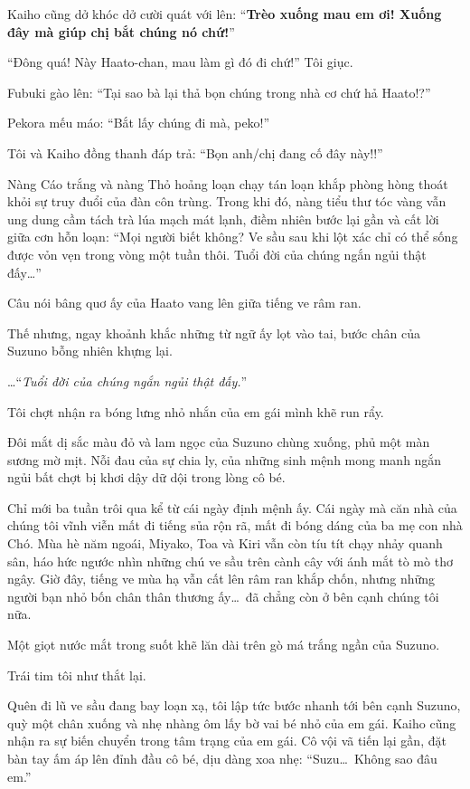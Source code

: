 \documentclass[../main.tex]{subfiles}
\begin{document}
Kaiho cũng dở khóc dở cười quát với lên: ``\textbf{Trèo xuống mau em ơi! Xuống đây mà giúp chị bắt chúng nó chứ!}''

``Đông quá! Này Haato-chan, mau làm gì đó đi chứ!'' Tôi giục.

Fubuki gào lên: ``Tại sao bà lại thả bọn chúng trong nhà cơ chứ hả Haato!?''

Pekora mếu máo: ``Bắt lấy chúng đi mà, peko!''

Tôi và Kaiho đồng thanh đáp trả: ``Bọn anh/chị đang cố đây này!!''

Nàng Cáo trắng và nàng Thỏ hoảng loạn chạy tán loạn khắp phòng hòng thoát khỏi sự truy đuổi của đàn côn trùng. Trong khi đó, nàng tiểu thư tóc vàng vẫn ung dung cầm tách trà lúa mạch mát lạnh, điềm nhiên bước lại gần và cất lời giữa cơn hỗn loạn: ``Mọi người biết không? Ve sầu sau khi lột xác chỉ có thể sống được vỏn vẹn trong vòng một tuần thôi. Tuổi đời của chúng ngắn ngủi thật đấy\dots''


Câu nói bâng quơ ấy của Haato vang lên giữa tiếng ve râm ran.

Thế nhưng, ngay khoảnh khắc những từ ngữ ấy lọt vào tai, bước chân của Suzuno bỗng nhiên khựng lại.

\dots ``\textit{Tuổi đời của chúng ngắn ngủi thật đấy.}''

Tôi chợt nhận ra bóng lưng nhỏ nhắn của em gái mình khẽ run rẩy.

Đôi mắt dị sắc màu đỏ và lam ngọc của Suzuno chùng xuống, phủ một màn sương mờ mịt. Nỗi đau của sự chia ly, của những sinh mệnh mong manh ngắn ngủi bất chợt bị khơi dậy dữ dội trong lòng cô bé.

Chỉ mới ba tuần trôi qua kể từ cái ngày định mệnh ấy. Cái ngày mà căn nhà của chúng tôi vĩnh viễn mất đi tiếng sủa rộn rã, mất đi bóng dáng của ba mẹ con nhà Chó. Mùa hè năm ngoái, Miyako, Toa và Kiri vẫn còn tíu tít chạy nhảy quanh sân, háo hức ngước nhìn những chú ve sầu trên cành cây với ánh mắt tò mò thơ ngây. Giờ đây, tiếng ve mùa hạ vẫn cất lên râm ran khắp chốn, nhưng những người bạn nhỏ bốn chân thân thương ấy\dots\ đã chẳng còn ở bên cạnh chúng tôi nữa.

Một giọt nước mắt trong suốt khẽ lăn dài trên gò má trắng ngần của Suzuno.

Trái tim tôi như thắt lại.

Quên đi lũ ve sầu đang bay loạn xạ, tôi lập tức bước nhanh tới bên cạnh Suzuno, quỳ một chân xuống và nhẹ nhàng ôm lấy bờ vai bé nhỏ của em gái. Kaiho cũng nhận ra sự biến chuyển trong tâm trạng của em gái. Cô vội vã tiến lại gần, đặt bàn tay ấm áp lên đỉnh đầu cô bé, dịu dàng xoa nhẹ: ``Suzu\dots\ Không sao đâu em.''
\end{document}
